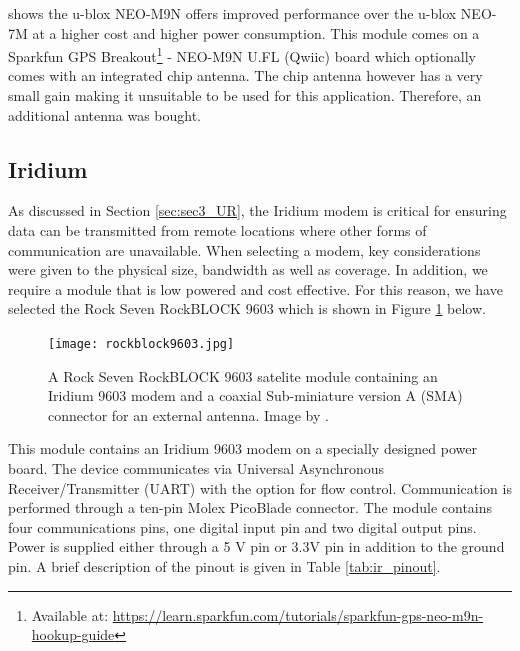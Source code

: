  shows the u-blox NEO-M9N offers improved performance  over the u-blox NEO-7M at a higher cost and higher power consumption. This module comes on a Sparkfun GPS Breakout\footnote{Available at: \url{https://learn.sparkfun.com/tutorials/sparkfun-gps-neo-m9n-hookup-guide}} - NEO-M9N U.FL (Qwiic) board which optionally comes with an integrated chip antenna. The chip antenna however has a very small gain making it unsuitable to be used for this application. Therefore, an additional antenna was bought. 

\subsection{Iridium}

As discussed in Section \ref{sec:sec3_UR}, the Iridium modem is critical for ensuring data can be transmitted from remote locations where other forms of communication are unavailable. When selecting a modem, key considerations were given to the physical size, bandwidth as well as coverage. In addition, we require a module that is low powered and cost effective. For this reason, we have selected the Rock Seven RockBLOCK 9603\cite{rockblock2019image} which is shown in Figure \ref{fig:rockblock} below.

\begin{figure}[H]
	\centering
	\texttt{[image: rockblock9603.jpg]}
	\caption{A Rock Seven RockBLOCK 9603 satelite module containing an Iridium 9603 modem \cite{9603} and a coaxial Sub-miniature version A (SMA) connector for an external antenna. Image by \textcite{rockblock2019image}.}
	\label{fig:rockblock}
\end{figure}

This module contains an Iridium 9603 modem on a specially designed power board. The device communicates via Universal Asynchronous Receiver/Transmitter (UART) with the option for flow control. Communication is performed through a ten-pin Molex PicoBlade connector. The module contains four communications pins, one digital input pin and two digital output pins. Power is supplied either through a 5 V pin or 3.3V pin in addition to the ground pin. A brief description of the pinout is given in Table \ref{tab:ir_pinout}. 

